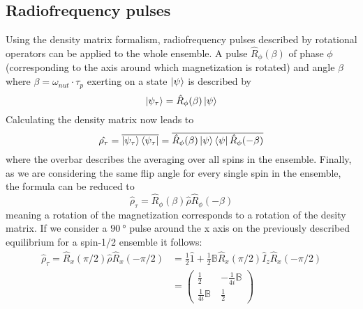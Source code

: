         \subsection{Radiofrequency pulses}
            Using the density matrix formalism, radiofrequency pulses described by rotational operators can be
            applied to the whole ensemble. A pulse $\hat R_\phi(\beta)$ of phase $\phi$ (corresponding
            to the axis around which magnetization is rotated) and angle $\beta$ where
            $\beta=\omega_{nut} \cdot \tau_p$ exerting on a state $\ket\psi$ is described by 
            \begin{equation}
                \ket{\psi_\tau}= \hat R_\phi(\beta)\ket\psi
            \end{equation}
            Calculating the density matrix now leads to
            \begin{equation}
                \hat {\rho_\tau} = \overline{\ket{\psi_\tau}\bra{\psi_\tau}} = \overline{\hat
                    R_{\phi}(\beta)\ket\psi\bra\psi \hat R_\phi(-\beta)}
            \end{equation}
            where the overbar describes the averaging over all spins in the ensemble.
            Finally, as we are considering the same flip angle for every single spin in the ensemble,
            the formula can be reduced to
            \begin{equation}
                \hat\rho_\tau = \hat R_\phi(\beta) \hat \rho \hat R_\phi(-\beta)
            \end{equation}
            meaning a rotation of the magnetization corresponds to a rotation of the desity matrix.
            If we consider a $\SI{90}{\degree}$ pulse around the x axis on the previously described
            equilibrium for a spin-1/2 ensemble it follows:
            \begin{equation}
                \begin{split}
                    \hat\rho_\tau = \hat R_x(\pi/2)\hat\rho\hat R_x(-\pi/2) &= \frac{1}{2} \hat 1 +
                    \frac{1}{2} \mathbb{B}\hat R_x(\pi/2) \hat I_z \hat R_x(-\pi/2)\\
                    &=
                    \begin{pmatrix}
                        \frac{1}{2} & -\frac{1}{4i}\mathbb{B}\\
                        \frac{1}{4i}\mathbb{B}\ & \frac{1}{2}
                    \end{pmatrix}
                \end{split}
            \end{equation}
